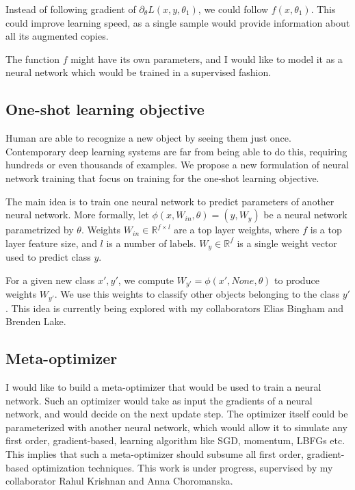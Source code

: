 \documentclass{article}
\begin{document}
Instead of following gradient of $\partial_\theta L(x, y, \theta_1)$, we could
follow $f(x, \theta_1)$.
This could improve learning speed, as a single sample would provide
information about all its augmented copies. 

The function $f$ might have its own parameters, and I would like to model it 
as a neural network which would be trained in a supervised fashion. 

\subsection{One-shot learning objective}
Human are able to recognize a new object by seeing them just once.
Contemporary deep learning systems are far from being able to do this,
requiring hundreds or even thousands of examples.  We propose a new
formulation of neural network training that focus on training for the
one-shot learning objective.

The main idea is to train one neural network to predict parameters of another neural network. 
More formally, let $\phi(x, W_{in}, \theta) = (y, W_{y})$ be a neural network parametrized
by $\theta$. Weights $W_{in} \in \mathbb{R}^{f \times l}$ are a top layer weights, where
$f$ is a top layer feature size, and $l$ is a number of labels. $W_{y} \in \mathbb{R}^f$ is a
single weight vector used to predict class $y$.

For a given new class $x', y'$, we compute $ W_{y'} = \phi(x', None, \theta)$ to produce weights $W_{y'}$. 
We use this weights to classify
other objects belonging to the class $y'$.
This idea is currently being explored with my collaborators Elias Bingham and Brenden Lake.

\subsection{Meta-optimizer}
\label{subsec:meta}
I would like to build a meta-optimizer that would be used to train a
neural network.  Such an optimizer would take as input the gradients
of a neural network, and would decide on the next update step. The
optimizer itself could be parameterized with another neural network,
which would allow it to simulate any first order, gradient-based,
learning algorithm like SGD, momentum, LBFGs etc. This implies that
such a meta-optimizer should subsume all first order, gradient-based
optimization techniques.  This work is under progress, 
supervised by my collaborator Rahul Krishnan and Anna Choromanska.
\end{document}
